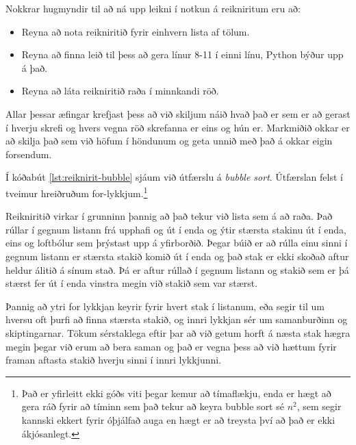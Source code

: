 \vspace{1cm}

Nokkrar hugmyndir til að ná upp leikni í notkun á reikniritum eru að:
\begin{itemize}
	\item Reyna að nota reikniritið fyrir einhvern lista af tölum.
	\item Reyna að finna leið til þess að gera línur 8-11 í einni línu, Python býður upp á það.
	\item Reyna að láta reikniritið raða í minnkandi röð.
\end{itemize}

Allar þessar æfingar krefjast þess að við skiljum náið hvað það er sem er að gerast í hverju skrefi og hvers vegna röð skrefanna er eins og hún er.
Markmiðið okkar er að skilja það sem við höfum í höndunum og geta unnið með það á okkar eigin forsendum.

\vspace{1cm} 

Í kóðabút \ref{lst:reiknirit-bubble} sjáum við útfærslu á \textit{bubble sort}.
Útfærslan felst í tveimur hreiðruðum for-lykkjum.\footnote{Það er yfirleitt ekki góðs viti þegar kemur að tímaflækju, enda er hægt að gera ráð fyrir að tíminn sem það tekur að keyra bubble sort sé $n^2$, sem segir kannski ekkert fyrir óþjálfað auga en hægt er að treysta því að það er ekki ákjósanlegt.}

Reikniritið virkar í grunninn þannig að það tekur við lista sem á að raða.
Það rúllar í gegnum listann frá upphafi og út í enda og ýtir stærsta stakinu út í enda, eins og loftbólur sem þrýstast upp á yfirborðið.
Þegar búið er að rúlla einu sinni í gegnum listann er stærsta stakið komið út í enda og það stak er ekki skoðað aftur heldur álitið á sínum stað.
Þá er aftur rúllað í gegnum listann og stakið sem er þá stærst fer út í enda vinstra megin við stakið sem var stærst.

Þannig að ytri for lykkjan keyrir fyrir hvert stak í listanum, eða segir til um hversu oft þurfi að finna stærsta stakið, og innri lykkjan sér um samanburðinn og skiptingarnar.
Tökum sérstaklega eftir þar að við getum horft á næsta stak hægra megin þegar við erum að bera saman og það er vegna þess að við hættum fyrir framan aftasta stakið hverju sinni í innri lykkjunni.


